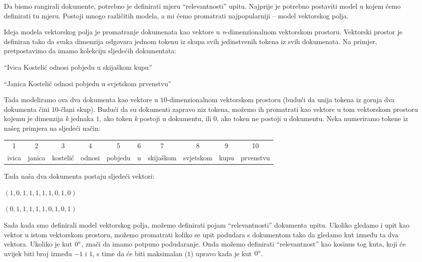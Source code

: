\documentclass[a4paper,twoside,12pt]{scrreprt}
\begin{document}
Da bismo rangirali dokumente, potrebno je definirati mjeru ``relevantnosti'' upitu. Najprije je potrebno postaviti model u kojem ćemo definirati tu mjeru. Postoji mnogo različitih modela, a mi ćemo promatrati najpopularniji – model vektorskog polja.

Ideja modela vektorskog polja je promatranje dokumenata kao vektore u \textit{n}-dimenzionalnom vektorskom prostoru. Vektorski prostor je definiran tako da svaka dimenzija odgovara jednom tokenu iz skupa svih jedinstvenih tokena iz svih dokumenata. Na primjer, pretpostavimo da imamo kolekciju sljedećih dokumentata:

\begin{compactenum}
  \item ``Ivica Kostelić odnosi pobjedu u skijaškom kupu''
  \item ``Janica Kostelić odnosi pobjedu u svjetskom prvenstvu''
\end{compactenum}

Tada modeliramo ova dva dokumenta kao vektore u $10$-dimenzionalnom vektorskom prostoru (budući da unija tokena iz gornja dva dokumenta čini $10$-člani skup). Budući da su dokumenti zapravo niz tokena, možemo ih promatrati kao vektore u tom vektorskom prostoru kojemu je dimenzija \textit{k} jednaka $1$, ako token \textit{k} postoji u dokumentu, ili $0$, ako token ne postoji u dokumentu. Neka numeriramo tokene iz našeg primjera na sljedeći način:

\begin{center}
  \begin{tabular}{@{\enspace}c@{\enspace}c@{\enspace}c@{\enspace}c@{\enspace}c@{\enspace}c@{\enspace}c@{\enspace}c@{\enspace}c@{\enspace}c@{\enspace}}
    1     & 2      & 3        & 4      & 5       & 6 & 7         & 8         & 9    & 10        \\
    ivica & janica & kostelić & odnosi & pobjedu & u & skijaškom & svjetskom & kupu & prvenstvu \\
  \end{tabular}
\end{center}

Tada naša dva dokumenta postaju sljedeći vektori:

\begin{compactenum}
  \item $(1,0,1,1,1,1,1,0,1,0)$
  \item $(0,1,1,1,1,1,0,1,0,1)$
\end{compactenum}

Sada kada smo definirali model vektorskog polja, možemo definirati pojam ``relevantnosti'' dokumenta upitu. Ukoliko gledamo i upit kao vektor u istom vektorskom prostoru, možemo promatrati koliko se upit podudara s dokumentom tako da gledamo kut između ta dva vektora. Ukoliko je kut $0\degree$, znači da imamo potpuno podudaranje. Onda možemo definirati ``relevantnost'' kao kosinus tog kuta, koji će uvijek biti broj između $-1$ i $1$, s time da će biti maksimalan ($1$) upravo kada je kut $0\degree$.
\end{document}
